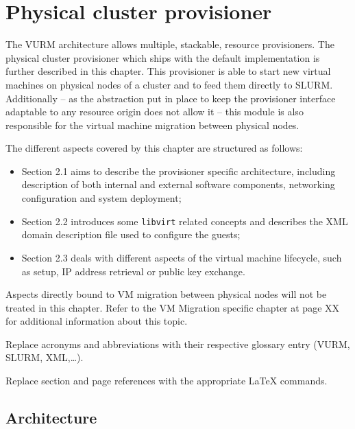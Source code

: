 \chapter{Physical cluster provisioner}

The VURM architecture allows multiple, stackable, resource provisioners. The physical cluster provisioner which ships with the default implementation is further described in this chapter. This provisioner is able to start new virtual machines on physical nodes of a cluster and to feed them directly to SLURM. Additionally – as the abstraction put in place to keep the provisioner interface adaptable to any resource origin does not allow it – this module is also responsible for the virtual machine migration between physical nodes.

The different aspects covered by this chapter are structured as follows:

\begin{itemize}
    \item Section 2.1 aims to describe the provisioner specific architecture, including description of both internal and external software components, networking configuration and system deployment;
    \item Section 2.2 introduces some \texttt{libvirt} related concepts and describes the XML domain description file used to configure the guests;
    \item Section 2.3 deals with different aspects of the virtual machine lifecycle, such as setup, IP address retrieval or public key exchange.
\end{itemize}

Aspects directly bound to VM migration between physical nodes will not be treated in this chapter. Refer to the VM Migration specific chapter at page XX for additional information about this topic.

\begin{todo}
Replace acronyms and abbreviations with their respective glossary entry (VURM, SLURM, XML,…).
\end{todo}

\begin{todo}
Replace section and page references with the appropriate {\LaTeX} commands.
\end{todo}


\section{Architecture}

